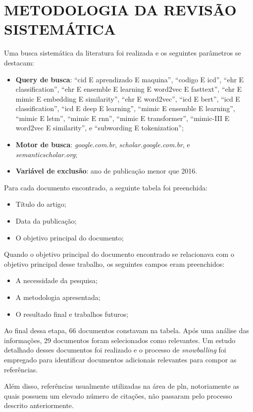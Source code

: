 \chapter{METODOLOGIA DA REVISÃO SISTEMÁTICA \label{appendix:revisao-literatura}}

Uma busca sistemática da literatura foi realizada e os seguintes parâmetros se destacam:
\begin{itemize}
   \item \textbf{Query de busca}:  \enquote{cid E aprendizado E maquina}, \enquote{codigo E icd}, \enquote{ehr E classification}, \enquote{ehr E ensemble E learning E word2vec E fasttext}, \enquote{ehr E mimic E embedding E similarity}, \enquote{ehr E word2vec}, \enquote{icd E bert}, \enquote{icd E classification}, \enquote{icd E deep E learning}, \enquote{mimic E ensemble E learning}, \enquote{mimic E lstm}, \enquote{mimic E rnn}, \enquote{mimic E transformer}, \enquote{mimic-III E word2vec E similarity}, e \enquote{subwording E tokenization};
   \item \textbf{Motor de busca}: \textit{google.com.br}, \textit{scholar.google.com.br}, e \textit{semanticscholar.org};
   \item \textbf{Variável de exclusão}: ano de publicação menor que 2016.
\end{itemize}
 
 Para cada documento encontrado, a seguinte tabela foi preenchida:
 \begin{itemize}
   \item Título do artigo;
   \item Data da publicação;
   \item O objetivo principal do documento;
 \end{itemize}
 
 Quando o objetivo principal do documento encontrado se relacionava com o objetivo principal desse trabalho, os seguintes campos eram preenchidos:
 \begin{itemize}
   \item A necessidade da pesquisa;
   \item A metodologia apresentada;
   \item O resultado final e trabalhos futuros;
  \end{itemize}
  
Ao final dessa etapa, 66 documentos constavam na tabela. Após uma análise das informações, 29 documentos foram selecionados como relevantes. Um estudo detalhado desses documentos foi realizado e o processo de \textit{snowballing} foi empregado para identificar documentos adicionais relevantes para compor as referências.

Além disso, referências usualmente utilizadas na área de \gls{pln}, notoriamente as quais possuem um elevado número de citações, não passaram pelo processo descrito anteriormente.
